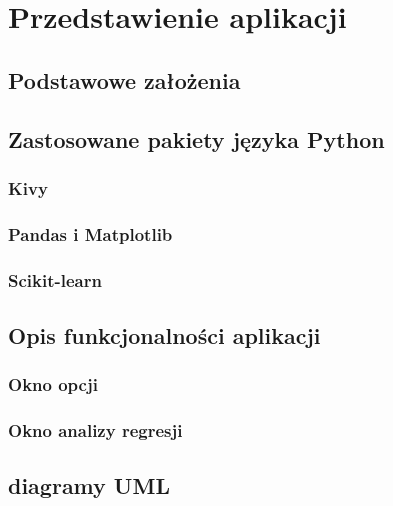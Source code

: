 
\chapter{Przedstawienie aplikacji}

\section{Podstawowe założenia}

\section{Zastosowane pakiety języka Python}

\subsection{Kivy}

\subsection{Pandas i Matplotlib}

\subsection{Scikit-learn}

\section{Opis funkcjonalności aplikacji}

\subsection{Okno opcji}

\subsection{Okno analizy regresji}

\section{diagramy UML}